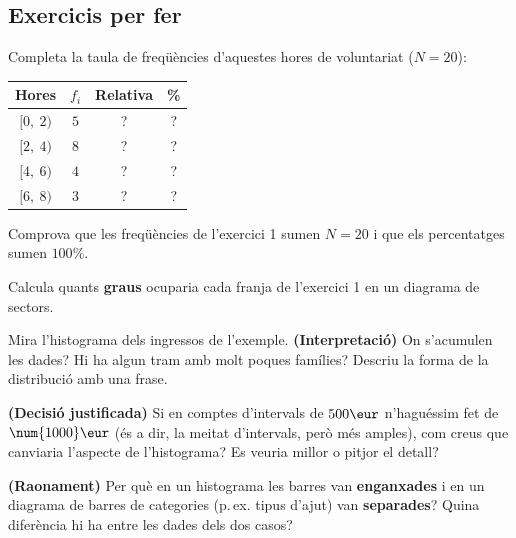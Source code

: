 \subsection{Exercicis per fer}

\begin{exercicis}
\begin{exlist}
  \item Completa la taula de freqüències d'aquestes hores de voluntariat ($N=20$):
        \begin{center}
        \begin{tabular}{c c c c}
        \toprule
        \textbf{Hores} & $f_i$ & \textbf{Relativa} & \textbf{\%} \\
        \midrule
        $[0,\ 2)$ & $5$ & ? & ? \\
        $[2,\ 4)$ & $8$ & ? & ? \\
        $[4,\ 6)$ & $4$ & ? & ? \\
        $[6,\ 8)$ & $3$ & ? & ? \\
        \bottomrule
        \end{tabular}
        \end{center}
  \item Comprova que les freqüències de l'exercici 1 sumen $N=20$ i que els
        percentatges sumen $100\%$.
  \item Calcula quants \textbf{graus} ocuparia cada franja de l'exercici 1 en un
        diagrama de sectors.
  \item Mira l'histograma dels ingressos de l'exemple. \textbf{(Interpretació)} On
        s'acumulen les dades? Hi ha algun tram amb molt poques famílies? Descriu la
        forma de la distribució amb una frase.
  \item \textbf{(Decisió justificada)} Si en comptes d'intervals de $500\eur$
        n'haguéssim fet de $\num{1000}\eur$ (és a dir, la meitat d'intervals, però
        més amples), com creus que canviaria l'aspecte de l'histograma? Es veuria
        millor o pitjor el detall?
  \item \textbf{(Raonament)} Per què en un histograma les barres van \textbf{enganxades}
        i en un diagrama de barres de categories (p.\,ex. tipus d'ajut) van
        \textbf{separades}? Quina diferència hi ha entre les dades dels dos casos?
\end{exlist}
\end{exercicis}

